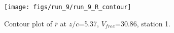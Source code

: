 \begin{figure}[H]
\centering
\texttt{[image: figs/run\_9/run\_9\_R\_contour]}
\caption{Contour plot of $\overline{r}$ at $z/c$=5.37, $V_{free}$=30.86, station 1.}
\label{fig:run_9_R_contour}
\end{figure}


